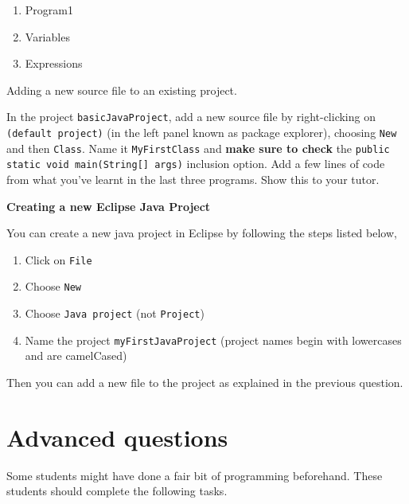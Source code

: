 \begin{questions}
\begin{enumerate}
	\begin{enumerate}
		\item Program1
		\item Variables
		\item Expressions
	\end{enumerate} 
\end{enumerate}

\question Adding a new source file to an existing project.

In the project \texttt{basicJavaProject}, add a new source file by right-clicking on \texttt{(default project)} (in the left panel known as package explorer), choosing \texttt{New} and then \texttt{Class}. Name it \texttt{MyFirstClass} and \textbf{make sure to check} the \texttt{public static void main(String[] args)} inclusion option. Add a few lines of code from what you've learnt in the last three programs. Show this to your tutor.

\question \textbf{Creating a new Eclipse Java Project}

You can create a new java project in Eclipse by following the steps listed below,

	\begin{enumerate}
	\item Click on \texttt{File}
	\item Choose \texttt{New}
	\item Choose \texttt{Java project} (not \texttt{Project})
	\item Name the project \texttt{myFirstJavaProject} (project names begin with lowercases and are camelCased)	
	\end{enumerate}

Then you can add a new file to the project as explained in the previous question.
\end{questions}

\newpage

\section*{Advanced questions}

Some students might have done a fair bit of programming beforehand. These students should complete the following tasks.

